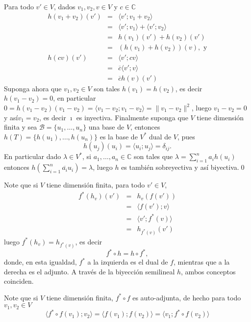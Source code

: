 \dem Para todo $v'\in V$, dados $v_1,v_2,v\in V$ y $c\in\mathbb{C}$
\begin{eqnarray*}
h(v_1+v_2)(v') & = & \langle v';v_1+v_2\rangle\\
  & = & \langle v';v_1\rangle + \langle v';v_2\rangle\\
  & = & h(v_1)(v')+h(v_2)(v')\\
  & = & \left(h(v_1)+h(v_2)\right)(v), \textrm{ y}\\
h(cv)(v') & = & \langle v';cv \rangle\\
  & = & \overline{c}\langle v';v\rangle\\
  & = & \overline{c}h(v)(v')
\end{eqnarray*}
Suponga ahora que $v_1,v_2\in V$ son tales $h(v_1)=h(v_2)$, es decir $h(v_1-v_2)=0$, en particular $0=h(v_1-v_2)(v_1-v_2)=\langle v_1-v_2;v_1-v_2 \rangle=\|v_1-v_2\|^2$, luego $v_1-v_2=0$ y as\'i$v_1=v_2$, es decir $\imath$ es inyectiva. Finalmente suponga que $V$ tiene dimensi\'on finita y sea $\mathcal{B}=\{u_1,\ldots,u_n\}$ una base de $V$, entonces $h(T)=\{h(u_1),\ldots,h(u_n)\}$ es la base de $V^*$ dual de $V$, pues
\[
h(u_j)(u_i)=\langle u_i;u_j\rangle=\delta_{ij}.
\] 
En particular dado $\lambda\in V^*$, si $a_1,\ldots,a_n\in\mathbb{C}$ son tales que $\lambda=\sum_{i=1}^na_ih(u_i)$ entonces $h(\sum_{i=1}^n\overline{a_i}u_i)=\lambda$, luego $h$ es tambi\'en sobreyectiva y as\'i biyectiva.\qed

\begin{obs}
Note que si $V$ tiene dimensi\'on finita, para todo $v'\in V$,
\begin{eqnarray*}
f^*(h_v)(v') & = & h_v\left(f(v')\right)\\
   & = & \langle f(v');v \rangle\\
   & = & \langle v';f^*(v)\rangle\\
   & = & h_{f^*(v)}(v')
\end{eqnarray*}
luego $f^*(h_v)=h_{f^*(v)}$, es decir
\[
f^*\circ h=h \circ f^*,
\]
donde, en esta igualdad, $f^*$ a la izquierda es el dual de $f$, mientras que a la derecha es el adjunto. A trav\'es de la biyecci\'on semilineal $h$, ambos conceptos coinciden.
\end{obs}

\begin{obs}
Note que si $V$ tiene dimensi\'on finita, $f^*\circ f$ es auto-adjunta, de hecho para todo $v_1,v_2\in V$
\[
\langle f^*\circ f(v_1);v_2\rangle=\langle f(v_1);f(v_2)\rangle=\langle v_1;f^*\circ f(v_2)\rangle
\]
\end{obs}

